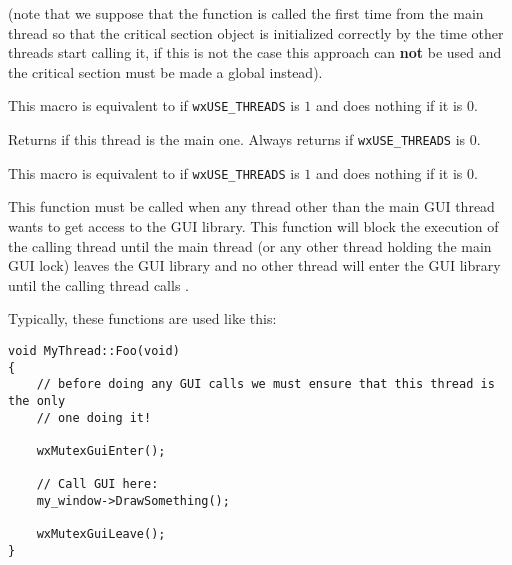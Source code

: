 (note that we suppose that the function is called the first time from the main
thread so that the critical section object is initialized correctly by the time
other threads start calling it, if this is not the case this approach can
{\bf not} be used and the critical section must be made a global instead).



\label{wxentercritsect}


This macro is equivalent to  if
{\tt wxUSE\_THREADS} is $1$ and does nothing if it is $0$.



\label{wxismainthread}


Returns \true if this thread is the main one. Always returns \true if
{\tt wxUSE\_THREADS} is $0$.



\label{wxleavecritsect}


This macro is equivalent to  if
{\tt wxUSE\_THREADS} is $1$ and does nothing if it is $0$.



\label{wxmutexguienter}


This function must be called when any thread other than the main GUI thread
wants to get access to the GUI library. This function will block the execution
of the calling thread until the main thread (or any other thread holding the
main GUI lock) leaves the GUI library and no other thread will enter the GUI
library until the calling thread calls .

Typically, these functions are used like this:

\begin{verbatim}
void MyThread::Foo(void)
{
    // before doing any GUI calls we must ensure that this thread is the only
    // one doing it!

    wxMutexGuiEnter();

    // Call GUI here:
    my_window->DrawSomething();

    wxMutexGuiLeave();
}
\end{verbatim}

